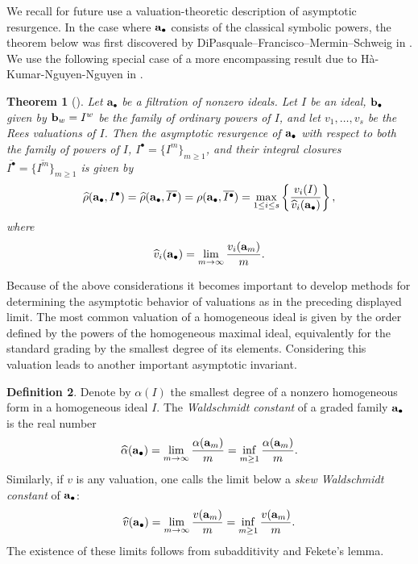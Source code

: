 \documentclass[11pt, reqno]{amsart}
\numberwithin{equation}{section}
\newtheorem{theorem}{Theorem}[section]
\theoremstyle{definition}
\newtheorem{definition}[theorem]{Definition}
\def\a{{\bf a}}
\def\b{{\bf b}}
\newcommand{\ba}{\mathbf{a}}
\begin{document}
We recall for future use a valuation-theoretic description of asymptotic resurgence. In the case where $\a_\bullet$ consists of the classical symbolic powers, the theorem below was first discovered by DiPasquale--Francisco--Mermin--Schweig in \cite[Theorem~4.10]{dipasquale2019asymptotic}. We use the following special case of  a more encompassing result due to H\`a-Kumar-Nguyen-Nguyen in \cite{HKNN}.

\begin{theorem}[{\cite[Theorem 2.13 and Corollary 4.11]{HKNN}}]\label{thm: DFMS}
Let $\ba_\bullet$ be a filtration of nonzero ideals. Let $I$ be an ideal, $\b_\bullet$ given by $\b_w=I^w$ be the family of ordinary powers of $I$, and let $v_1,\ldots,v_s$ be the Rees valuations of $I$. Then
the asymptotic resurgence of $\a_\bullet$ with respect to both the family of powers of $I$, $I^\bullet=\{I^m\}_{m\geq 1}$, and their integral closures $\overline{I^\bullet}=\{\overline{I^m}\}_{m\geq 1}$  is given by
\[
\widehat{\rho}(\a_\bullet, I^\bullet)=\widehat{\rho}(\a_\bullet, \overline{I^\bullet})={\rho}(\a_\bullet, \overline{I^\bullet})=\max_{1\le i\le s}
\left\{\frac{v_i(I)}{\widehat{v}_i(\a_\bullet)}\right\},
\]
where
\[
\widehat{v}_i(\a_\bullet)=\lim_{m\to\infty}\frac{v_i(\a_m)}{m}.
\]
\end{theorem}

Because of the above considerations it becomes important to develop methods for determining the asymptotic behavior of valuations as in the preceding displayed limit. The most common valuation of a homogeneous ideal is given by the order defined by the powers of the homogeneous maximal ideal, equivalently for the standard grading by the smallest degree of  its elements. Considering this valuation leads to another important asymptotic invariant.

\begin{definition}
\label{def:waldschmidt}
Denote by $\alpha(I)$ the smallest degree of a nonzero homogeneous form in a homogeneous ideal $I$. The {\em Waldschmidt constant} of a graded family $\a_\bullet$ is the real number
\[
\widehat{\alpha}(\a_\bullet)=\lim_{m\to\infty}\frac{\alpha(\a_m)}{m}=\inf_{m\geq1}\frac{\alpha(\a_m)}{m}.
\]
Similarly, if $v$ is any valuation, one calls the limit below a {\em skew Waldschmidt constant} of $\a_\bullet$:
\[
\widehat{v}(\a_\bullet)=\lim_{m\to\infty}\frac{v(\a_m)}{m}=\inf_{m\geq1}\frac{v(\a_m)}{m}.
\]
The existence of these limits follows from subadditivity and Fekete's lemma.
\end{definition}
\end{document}
